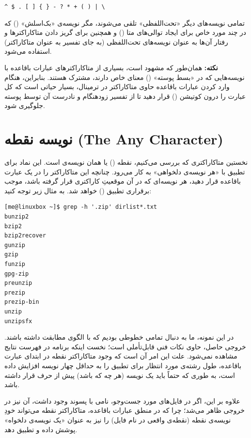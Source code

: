\begin{latin}
\begin{lstlisting}
^ $ . [ ] { } - ? * + ( ) | \
\end{lstlisting}
\end{latin}

تمامی نویسه‌های دیگر «تحت‌اللفظی» تلقی می‌شوند، مگر نویسه‌ی «بک‌اسلش» (\cmd{\textbackslash}) که در چند مورد خاص برای ایجاد توالی‌های متا () و همچنین برای گریز دادن متاکاراکترها و رفتار آن‌ها به عنوان نویسه‌های تحت‌اللفظی (به جای تفسیر به عنوان متاکاراکتر) استفاده می‌شود.

\begin{note}
\textbf{نکته:} همان‌طور که مشهود است، بسیاری از متاکاراکترهای عبارات باقاعده با نویسه‌هایی که در «بسط پوسته» () معنای خاص دارند، مشترک هستند. بنابراین، هنگام وارد کردن عبارات باقاعده حاوی متاکاراکتر در ترمینال، بسیار حیاتی است که کل عبارت را درون کوتیشن () قرار دهید تا از تفسیر زودهنگام و نادرست آن توسط پوسته جلوگیری شود.
\end{note}

\section{نویسه نقطه (The Any Character)}

نخستین متاکاراکتری که بررسی می‌کنیم، نقطه () یا همان نویسه‌ی  است. این نماد برای تطبیق با «هر نویسه‌ی دلخواهی» به کار می‌رود. چنانچه این متاکاراکتر را در یک عبارت باقاعده قرار دهید، هر نویسه‌ای که در آن موقعیتِ کاراکتری قرار گرفته باشد، موجب برقراری تطبیق () خواهد شد. به مثال زیر توجه کنید:

\begin{latin}
\begin{lstlisting}
[me@linuxbox ~]$ grep -h '.zip' dirlist*.txt
bunzip2
bzip2
bzip2recover
gunzip
gzip
funzip
gpg-zip
preunzip
prezip
prezip-bin
unzip
unzipsfx
\end{lstlisting}
\end{latin}

در این نمونه، ما به دنبال تمامی خطوطی بودیم که با الگوی  مطابقت داشته باشند. خروجی حاصل، حاوی نکات فنی قابل‌تأملی است؛ نخست اینکه برنامه  در فهرست نتایج مشاهده نمی‌شود. علت این امر آن است که وجود متاکاراکتر نقطه در ابتدای عبارت باقاعده، طول رشته‌ی مورد انتظار برای تطبیق را به حداقل چهار نویسه افزایش داده است، به طوری که حتماً باید یک نویسه (هر چه که باشد) پیش از حرف  قرار داشته باشد.

علاوه بر این، اگر در فایل‌های مورد جست‌وجو، نامی با پسوند  وجود داشت، آن نیز در خروجی ظاهر می‌شد؛ چرا که در منطق عبارات باقاعده، متاکاراکتر نقطه می‌تواند خودِ نویسه‌ی نقطه (نقطه‌ی واقعی در نام فایل) را نیز به عنوان «یک نویسه‌ی دلخواه» پوشش داده و تطبیق دهد.

